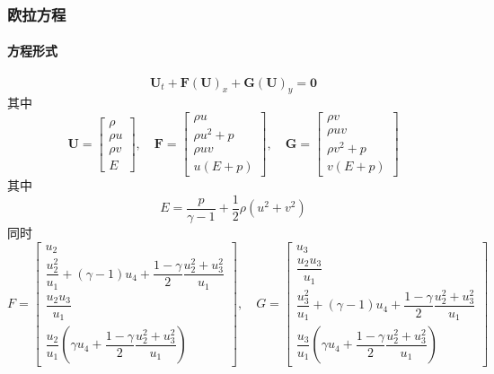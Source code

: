 \documentclass{book}
\begin{document}
\subsubsection{欧拉方程}
\paragraph{方程形式}
\begin{equation}
    \mathbf{U}_{t}+\mathbf{F}(\mathbf{U})_{x}+\mathbf{G}(\mathbf{U})_{y}=\mathbf{0}
\end{equation}
其中
\begin{equation}
    \mathbf{U}=\left[\begin{array}{c}
            \rho   \\
            \rho u \\
            \rho v \\
            E
        \end{array}\right], \quad \mathbf{F}=\left[\begin{array}{c}
            \rho u       \\
            \rho u^{2}+p \\
            \rho u v     \\
            u(E+p)
        \end{array}\right], \quad \mathbf{G}=\left[\begin{array}{c}
            \rho v       \\
            \rho u v     \\
            \rho v^{2}+p \\
            v(E+p)
        \end{array}\right]
\end{equation}
其中
\begin{equation}
    E=\dfrac{p}{\gamma-1}+\dfrac{1}{2} \rho\left(u^{2}+v^{2}\right)
\end{equation}
同时
\begin{equation}
    F = \begin{bmatrix}
        u_2                                                                          \\
        \dfrac{u_2^2}{u_1}+(\gamma-1)u_4+\dfrac{1-\gamma}{2}\dfrac{u_2^2+u_3^2}{u_1} \\
        \dfrac{u_2u_3}{u_1}                                                          \\
        \dfrac{u_2}{u_1}\left(\gamma u_4+\dfrac{1-\gamma}{2}\dfrac{u_2^2+u_3^2}{u_1}\right)
    \end{bmatrix}
    ,\quad G=\begin{bmatrix}
        u_3                                                                          \\
        \dfrac{u_2u_3}{u_1}                                                          \\
        \dfrac{u_3^2}{u_1}+(\gamma-1)u_4+\dfrac{1-\gamma}{2}\dfrac{u_2^2+u_3^2}{u_1} \\
        \dfrac{u_3}{u_1}\left(\gamma u_4+\dfrac{1-\gamma}{2}\dfrac{u_2^2+u_3^2}{u_1}\right)
    \end{bmatrix}
\end{equation}
\end{document}

